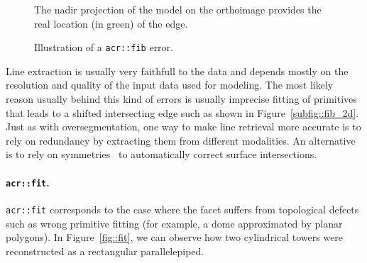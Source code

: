 \begin{figure}[htbp]
{\begin{subfloatrow}
{                                }{
                                    \caption{
                                        \label{subfig::fib_2d}
                                        The nadir projection of the model on the orthoimage provides the real location (in green) of the edge.
                                    }
                                }
                        \end{subfloatrow}
                    }{
                        \caption{
                            \label{fig::fib}
                            Illustration of a \texttt{\gls{acr::fib}} error.
                        }
                    }
                \end{figure}

                Line extraction is usually very faithfull to the data and depends mostly on the resolution and quality of the input data used for modeling.
                The most likely reason usually behind this kind of errors is usually imprecise fitting of primitives that leads to a shifted intersecting edge such as shown in Figure~\ref{subfig::fib_2d}.\\

                Just as with oversegmentation, one way to make line retrieval more accurate is to rely on redundancy by extracting them from different modalities.
                An alternative is to rely on symmetries~\parencite{verma20063d} to automatically correct surface intersections.

            \paragraph{\texttt{\acrlong*{acr::fit}}.}
                \texttt{\gls{acr::fit}} corresponds to the case where the facet suffers from topological defects such as wrong primitive fitting (for example, a dome approximated by planar polygons).
                In Figure~\ref{fig::fit}, we can observe how two cylindrical towers were reconstructed as a rectangular parallelepiped.\\

